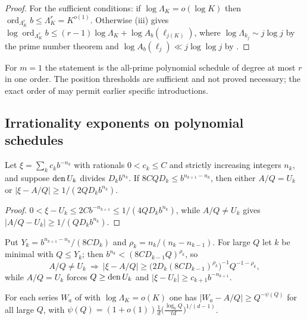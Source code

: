 \documentclass[11pt]{article}
\DeclareMathOperator{\ord}{ord}
\begin{document}
\begin{proof}
For the sufficient conditions: if $\log\Lambda_K=o(\log K)$ then $\ord_{\Lambda_K^r}b\le\Lambda_K^r=K^{o(1)}$. Otherwise
(iii) gives $\log\ord_{\Lambda_K^r}b\le(r-1)\log\Lambda_K+\log A_b(\ell_{j(K)})$, where $\log\Lambda_{k_j}\sim j\log j$ by the prime
number theorem and $\log A_b(\ell_j)\ll j\log\log j$ by .
\end{proof}

For $m=1$ the statement is the all-prime polynomial schedule of degree at most $r$ in one order. The position
thresholds are sufficient and not proved necessary; the exact order of  may permit earlier
specific introductions.

\subsection{Irrationality exponents on polynomial schedules}

\begin{lemma}\label{lem:truncation}
Let $\xi=\sum_kc_kb^{-n_k}$ with rationals $0<c_k\le C$ and strictly increasing integers $n_k$, and suppose $\operatorname{den} U_k$ divides
$D_kb^{n_k}$. If $8CQD_k\le b^{n_{k+1}-n_k}$, then either $A/Q=U_k$ or $|\xi-A/Q|\ge1/(2QD_kb^{n_k})$.
\end{lemma}

\begin{proof}
$0<\xi-U_k\le2Cb^{-n_{k+1}}\le1/(4QD_kb^{n_k})$, while $A/Q\ne U_k$ gives $|A/Q-U_k|\ge1/(QD_kb^{n_k})$.
\end{proof}

Put $Y_k=b^{n_{k+1}-n_k}/(8CD_k)$ and $\rho_k=n_k/(n_k-n_{k-1})$. For large $Q$ let $k$ be minimal with $Q\le Y_k$; then
$b^{n_k}<(8CD_{k-1}Q)^{\rho_k}$, so
\begin{equation}\label{eq:separation}
A/Q\ne U_k\ \Longrightarrow\ |\xi-A/Q|\ge\bigl(2D_k(8CD_{k-1})^{\rho_k}\bigr)^{-1}Q^{-1-\rho_k},
\end{equation}
while $A/Q=U_k$ forces $Q\ge\operatorname{den} U_k$ and $|\xi-U_k|\ge c_{k+1}b^{-n_{k+1}}$.

\begin{proposition}\label{prop:ratioone}
For each series $W_a$ of  with $\log\Lambda_K=o(K)$ one has $|W_a-A/Q|\ge Q^{-\psi(Q)}$ for all large $Q$, with
$\psi(Q)=(1+o(1))\frac1d\bigl(\frac{\log_bQ}{td}\bigr)^{1/(d-1)}$.
\end{proposition}
\end{document}
